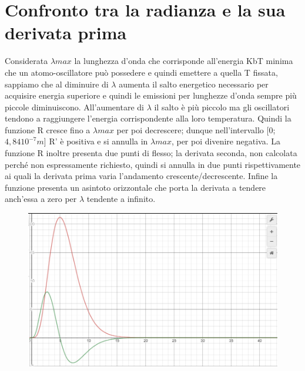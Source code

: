 \documentclass{article}
\theoremstyle{definition}
\begin{document}
\section*{Confronto tra la radianza e la sua derivata prima}
Considerata \(\lambda max\) la lunghezza d'onda che corrisponde all'energia KbT minima che un atomo-oscillatore può possedere e quindi emettere a quella T fissata, sappiamo che al diminuire di \(\lambda\) aumenta il salto energetico necessario per acquisire energia superiore e quindi le emissioni per lunghezze d'onda sempre più piccole diminuiscono. All'aumentare di \(\lambda\) il salto è più piccolo ma gli oscillatori tendono a raggiungere l'energia corrispondente alla loro temperatura.
Quindi la funzione R cresce fino a \(\lambda max\) per poi decrescere; dunque nell'intervallo [0;\(4,84 10^{-7}m\)] R' è positiva e si annulla in \(\lambda max\), per poi divenire negativa. La funzione R inoltre presenta due punti di flesso; la derivata seconda, non calcolata perché non espressamente richiesto, quindi si annulla in due punti rispettivamente ai quali la derivata prima varia l'andamento crescente/decrescente. Infine la funzione presenta un asintoto orizzontale che porta la derivata a tendere anch'essa a zero per \(\lambda\) tendente a infinito.
\begin{figure}[h!]
    \centering
    \includegraphics[scale=0.40]{grafico3.png}
\end{figure}
\end{document}
